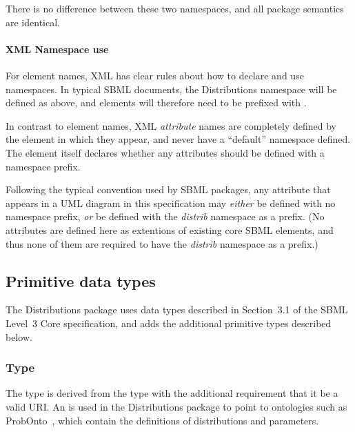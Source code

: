 \documentclass[draftspec]{sbmlpkgspec}
\newcommand{\fixttspace}{\hspace*{1pt}}
\newcommand{\sbmlthreecore}{SBML Level~3 Core\xspace}
\newcommand{\distrib}{Distributions\xspace}
\begin{document}
There is no difference between these two namespaces, and all package semantics are identical.

\paragraph{XML Namespace use}

For element names, XML has clear rules about how to declare and use namespaces.  In typical SBML documents, the \distrib namespace will be defined as above, and elements will therefore need to be prefixed with .

In contrast to element names, XML \emph{attribute} names are completely defined by the element in which they appear, and never have a ``default'' namespace defined. The element itself declares whether any attributes should be defined with a namespace prefix.

Following the typical convention used by SBML packages, any attribute that appears in a UML diagram in this specification may \emph{either} be defined with no namespace prefix, \emph{or} be defined with the \emph{distrib} namespace as a prefix.  (No attributes are defined here as extentions of existing core SBML elements, and thus none of them are required to have the \emph{distrib} namespace as a prefix.)


\subsection{Primitive data types}
\label{new-primitive-types}

The \distrib package uses data types described in Section~3.1 of the \sbmlthreecore specification, and adds the additional primitive types described below.

\subsubsection{Type \fixttspace{}}
\label{sec:primtype-externalref}

The type  is derived from the type  with the additional requirement that it be a valid URI.  An  is used in the \distrib package to point to ontologies such as ProbOnto~\citep{swat:2016}, which contain the definitions of distributions and parameters.


\end{document}
